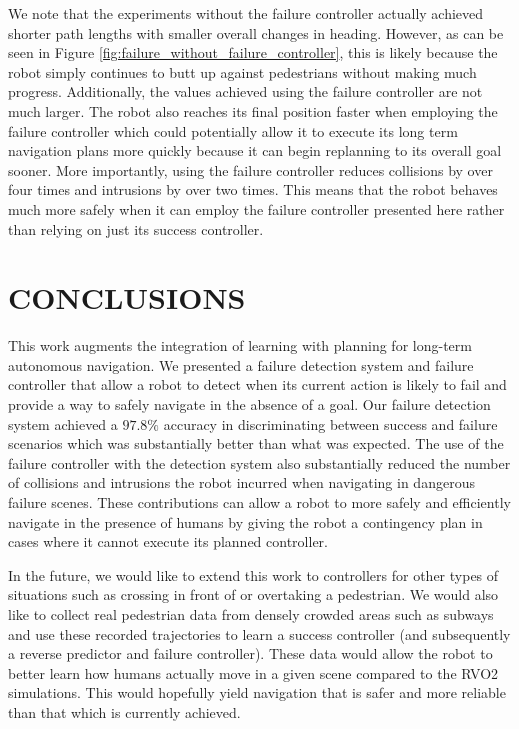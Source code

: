 \documentclass[letterpaper, 10 pt, conference]{ieeeconf}  %
\begin{document}
	We note that the experiments without the failure controller actually achieved shorter path lengths with smaller overall changes in heading. However, as can be seen in Figure \ref{fig:failure_without_failure_controller}, this is likely because the robot simply continues to butt up against pedestrians without making much progress. Additionally, the values achieved using the failure controller are not much larger. The robot also reaches its final position faster when employing the failure controller which could potentially allow it to execute its long term navigation plans more quickly because it can begin replanning to its overall goal sooner. More importantly, using the failure controller reduces collisions by over four times and intrusions by over two times. This means that the robot behaves much more safely when it can employ the failure controller presented here rather than relying on just its success controller. 

\section{CONCLUSIONS}\label{sec:conclusion}

	This work augments the integration of learning with planning for long-term autonomous navigation. We presented a failure detection system and failure controller that allow a robot to detect when its current action is likely to fail and provide a way to safely navigate in the absence of a goal. Our failure detection system achieved a $97.8\%$ accuracy in discriminating between success and failure scenarios which was substantially better than what was expected. The use of the failure controller with the detection system also substantially reduced the number of collisions and intrusions the robot incurred when navigating in dangerous failure scenes. These contributions can allow a robot to more safely and efficiently navigate in the presence of humans by giving the robot a contingency plan in cases where it cannot execute its planned controller.
	
	In the future, we would like to extend this work to controllers for other types of situations such as crossing in front of or overtaking a pedestrian. We would also like to collect real pedestrian data from densely crowded areas such as subways and use these recorded trajectories to learn a success controller (and subsequently a reverse predictor and failure controller). These data would allow the robot to better learn how humans actually move in a given scene compared to the RVO2 simulations. This would hopefully yield navigation that is safer and more reliable than that which is currently achieved.
\end{document}
